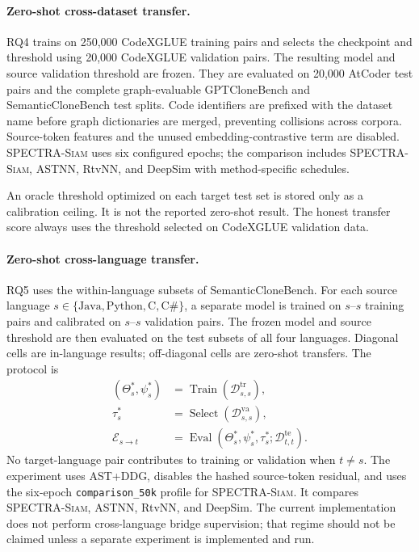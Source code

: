 \documentclass[authoryear,final,5p,times,twocolumn]{elsarticle}
\newcommand{\method}{\textsc{SPECTRA-Siam}}
\newcommand{\added}[1]{{\color{green!50!black}#1}}
\theoremstyle{plain}
\begin{document}
\begingroup
\color{green!50!black}
\paragraph{Zero-shot cross-dataset transfer.}
RQ4 trains on 250,000 CodeXGLUE training pairs and selects the checkpoint and
threshold using 20,000 CodeXGLUE validation pairs. The resulting model and
source validation threshold are frozen. They are evaluated on 20,000 AtCoder
test pairs and the complete graph-evaluable GPTCloneBench and
SemanticCloneBench test splits. Code identifiers are prefixed with the dataset
name before graph dictionaries are merged, preventing collisions across
corpora. Source-token features and the unused embedding-contrastive term are
disabled. \method{} uses six configured epochs; the comparison includes
\method{}, ASTNN, RtvNN, and DeepSim with method-specific schedules.

An oracle threshold optimized on each target test set is stored only as a
calibration ceiling. It is not the reported zero-shot result. The honest transfer
score always uses the threshold selected on CodeXGLUE validation data.
\endgroup

\paragraph{Zero-shot cross-language transfer.}
RQ5 uses the within-language subsets of SemanticCloneBench. For each source
language $s\in\{\mathrm{Java},\mathrm{Python},\mathrm{C},\mathrm{C\#}\}$, a
separate model is trained on $s$--$s$ training pairs and calibrated on $s$--$s$
validation pairs. The frozen model and source threshold are then evaluated on
the test subsets of all four languages. Diagonal cells are in-language results;
off-diagonal cells are zero-shot transfers. The protocol is
\begin{align}
(\Theta_s^*,\psi_s^*)
&=\operatorname{Train}(\mathcal{D}_{s,s}^{\mathrm{tr}}), \nonumber\\
\tau_s^*
&=\operatorname{Select}(\mathcal{D}_{s,s}^{\mathrm{va}}), \nonumber\\
\mathcal{E}_{s\rightarrow t}
&=\operatorname{Eval}\!\left(
\Theta_s^*,\psi_s^*,\tau_s^*;
\mathcal{D}_{t,t}^{\mathrm{te}}
\right).
\label{eq:cross_language_protocol}
\end{align}
No target-language pair contributes to training or validation when $t\neq s$.
\added{The experiment uses AST+DDG, disables the hashed source-token residual, and
uses the six-epoch \texttt{comparison\_50k} profile for \method{}. It compares
\method{}, ASTNN, RtvNN, and DeepSim. The current implementation does not
perform cross-language bridge supervision; that regime should not be claimed
unless a separate experiment is implemented and run.}
\end{document}
